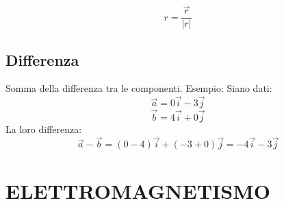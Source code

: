 \documentclass{article}
\begin{document}
\begin{equation*}
  r=\frac{\overrightarrow{r}}{|r|}
\end{equation*}


\subsection{Differenza}

Somma della differenza tra le componenti. Esempio:
Siano dati:
\begin{equation*}
  \overrightarrow{a} = 0\overrightarrow{i}-3\overrightarrow{j}
\end{equation*}
\begin{equation*}
  \overrightarrow{b} = 4\overrightarrow{i}+0\overrightarrow{j}
\end{equation*}
La loro differenza:
\begin{equation*}
  \overrightarrow{a}-\overrightarrow{b} = (0-4)\overrightarrow{i}+(-3+0)\overrightarrow{j} = -4\overrightarrow{i}-3\overrightarrow{j}
\end{equation*}

\section{ELETTROMAGNETISMO}
\end{document}
